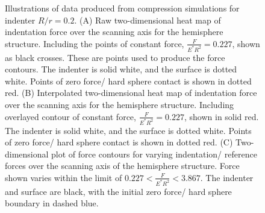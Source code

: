 \begin{figure}[H]
\begin{subfigure}[t]{0.325\textwidth}
    \end{subfigure}
    \hfill
    \begin{subfigure}[t]{0.325\textwidth}
        \centering
        \caption{\label{fig: Hemisphere-LineContour-1} }
        \vspace{-0.1in}
    \end{subfigure} 
    \caption{\label{fig: Hemisphere-ContourPlot}Illustrations of data produced from compression simulations for indenter $R/r=0.2$. (A) Raw two-dimensional heat map of indentation force over the scanning axis for the hemisphere structure. Including the points of constant force, $\frac{F}{E^*R^2} = 0.227 $, shown as black crosses. These are points used to produce the force contours. The indenter is solid white, and the surface is dotted white. Points of zero force/ hard sphere contact is shown in dotted red. (B) Interpolated two-dimensional heat map of indentation force over the scanning axis for the hemisphere structure. Including overlayed contour of constant force, $\frac{F}{E^*R^2} = 0.227 $, shown in solid red. The indenter is solid white, and the surface is dotted white. Points of zero force/ hard sphere contact is shown in dotted red. (C) Two-dimensional plot of force contours for varying indentation/ reference forces over the scanning axis of the hemisphere structure. Force shown varies within the limit of $ 0.227 < \frac{F}{E^*R^2} < 3.867 $. The indenter and surface are black, with the initial zero force/ hard sphere boundary in dashed blue.}
    
\end{figure}

